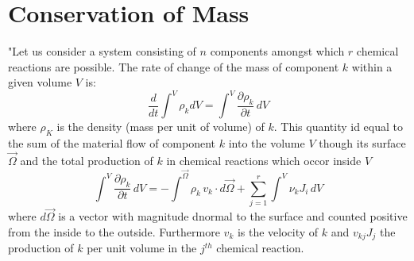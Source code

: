 \section{Conservation of Mass}

"Let us consider a system consisting of $n$ components amongst which $r$ chemical reactions are possible. 
The rate of change of the mass of component $k$ within a given volume $V$ is:
\begin{equation}
\frac{d}{dt}\int^V \rho_k dV = \int^V \frac{\partial \rho_k}{\partial t}\, dV
\label{dGM1}
\end{equation}
where $\rho_K$ is the density (mass per unit of volume) of $k$. This quantity id equal to the sum of the material flow of component $k$ into the volume $V$ though its surface $\vec{\Omega}$ and the total production of $k$ in chemical reactions which occor inside $V$
\begin{equation}
\int^V \frac{\partial \rho_k}{\partial t}\, dV = - \int^\vec{\Omega} \rho_k\, v_k \cdot d\vec{\Omega} + \sum_{j=1}^r \int^V \nu_k J_i\, dV
\label{dGM2}
\end{equation}
where $d\vec{\Omega}$ is a vector with magnitude d\Omega normal to the surface and counted positive from the inside to the outside. Furthermore $v_k$ is the velocity of $k$ and $v_{kj} J_j$  the production of $k$ per unit volume in the $j^{th}$ chemical reaction.  
